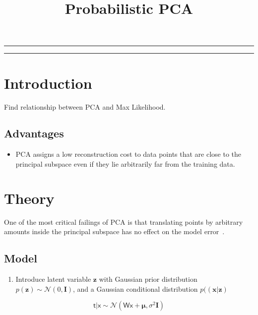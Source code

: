
\title{Probabilistic PCA}
\date{}

\maketitle
\rule[0pt]{\textwidth}{1pt}
\tableofcontents
\rule[0pt]{\textwidth}{1pt}



\section{Introduction}
Find relationship between PCA and Max Likelihood.

\subsection{Advantages}
\begin{itemize}
\item PCA assigns a low reconstruction cost to data points that are close to the principal subspace even if they lie arbitrarily far from the training data.
\end{itemize}


\section{Theory}
One of the most critical failings of PCA is that translating points by arbitrary amounts inside the principal subspace has no effect on the model error~\cite{1999_JNL_Gaussian_roweis}.



\subsection{Model}
\begin{enumerate}
\item Introduce latent variable $\mathbf{z}$ with Gaussian prior distribution $p(\mathbf{z}) \sim \mathcal{N}(0, \mathbf{I})$, and a Gaussian conditional distribution $p((\mathbf{x}|\mathbf{z})$

\end{enumerate}

\begin{equation}
\mathsf{t|x} \sim \mathcal{N}(\mathsf{Wx} + \mathbf{\mu}, \sigma^2\mathbf{I})
\end{equation}


